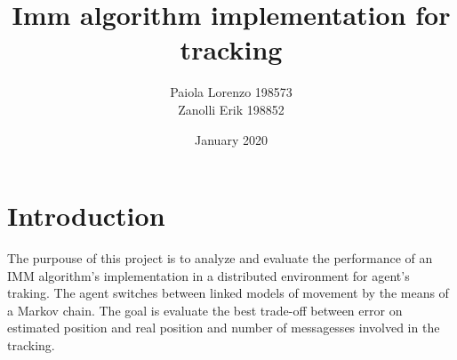 \documentclass{article}
\title{Imm algorithm implementation for tracking}
\author{
Paiola Lorenzo 198573 

Zanolli Erik 198852}
\date{January 2020}
\begin{document}
\maketitle



\section*{Introduction}
\justify
The purpouse of this project is to analyze and evaluate the performance of an IMM algorithm's implementation in a distributed environment for
agent's traking. The agent switches between linked models of movement by the means of a Markov chain. The goal is evaluate the best trade-off
between error on estimated position and real position and number of messagesses involved in the tracking.
\end{document}

